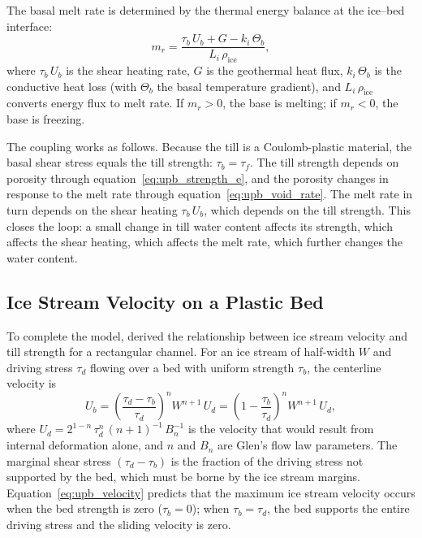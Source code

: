 \documentclass[11pt]{article}
\begin{document}
\medskip
\noindent The basal melt rate is determined by the thermal energy balance at the ice--bed interface:
\begin{equation}
  \boxed{m_r = \frac{\tau_b\,U_b + G - k_i\,\Theta_b}{L_i\,\rho_{\text{ice}}},}
  \label{eq:upb_melt}
\end{equation}
where $\tau_b\,U_b$ is the shear heating rate, $G$ is the geothermal heat flux, $k_i\,\Theta_b$ is the conductive heat loss (with $\Theta_b$ the basal temperature gradient), and $L_i\,\rho_{\text{ice}}$ converts energy flux to melt rate.  If $m_r > 0$, the base is melting; if $m_r < 0$, the base is freezing.

\medskip
\noindent The coupling works as follows.  Because the till is a Coulomb-plastic material, the basal shear stress equals the till strength: $\tau_b = \tau_f$.  The till strength depends on porosity through equation~\eqref{eq:upb_strength_e}, and the porosity changes in response to the melt rate through equation~\eqref{eq:upb_void_rate}.  The melt rate in turn depends on the shear heating $\tau_b\,U_b$, which depends on the till strength.  This closes the loop: a small change in till water content affects its strength, which affects the shear heating, which affects the melt rate, which further changes the water content.

\subsection{Ice Stream Velocity on a Plastic Bed}

To complete the model, \cite{Tulaczyketal2000b} derived the relationship between ice stream velocity and till strength for a rectangular channel.  For an ice stream of half-width $W$ and driving stress $\tau_d$ flowing over a bed with uniform strength $\tau_b$, the centerline velocity is
\begin{equation}
  U_b = \left(\frac{\tau_d - \tau_b}{\tau_d}\right)^n W^{n+1}\,U_d = \left(1 - \frac{\tau_b}{\tau_d}\right)^n W^{n+1}\,U_d,
  \label{eq:upb_velocity}
\end{equation}
where $U_d = 2^{1-n}\,\tau_d^n\,(n+1)^{-1}\,B_n^{-1}$ is the velocity that would result from internal deformation alone, and $n$ and $B_n$ are Glen's flow law parameters.  The marginal shear stress $(\tau_d - \tau_b)$ is the fraction of the driving stress not supported by the bed, which must be borne by the ice stream margins.  Equation~\eqref{eq:upb_velocity} predicts that the maximum ice stream velocity occurs when the bed strength is zero ($\tau_b = 0$); when $\tau_b = \tau_d$, the bed supports the entire driving stress and the sliding velocity is zero.
\end{document}
